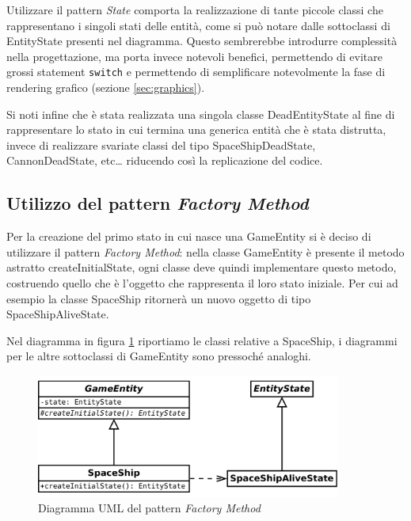 \documentclass[a4paper,12pt]{article}
\begin{document}
Utilizzare il pattern \emph{State} comporta la realizzazione di tante piccole classi che rappresentano i singoli stati delle entit\`a, come si pu\`o notare dalle sottoclassi di \textsf{EntityState} presenti nel diagramma. Questo sembrerebbe introdurre complessit\`a nella progettazione, ma porta invece notevoli benefici, permettendo di evitare grossi statement \texttt{switch} e permettendo di semplificare notevolmente la fase di rendering grafico (sezione \ref{sec:graphics}).

Si noti infine che \`e stata realizzata una singola classe \textsf{DeadEntityState} al fine di rappresentare lo stato in cui termina una generica entit\`a che \`e stata distrutta, invece di realizzare svariate classi del tipo \textsf{SpaceShipDeadState}, \textsf{CannonDeadState}, etc\dots{} riducendo cos\`i la replicazione del codice.

\subsection{Utilizzo del pattern \emph{Factory Method}}
\label{sec:factory}

Per la creazione del primo stato in cui nasce una \textsf{GameEntity} si \`e deciso di utilizzare il pattern \emph{Factory Method}: nella classe \textsf{GameEntity} \`e presente il metodo astratto \textsf{createInitialState}, ogni classe deve quindi implementare questo metodo, costruendo quello che \`e l'oggetto che rappresenta il loro stato iniziale. Per cui ad esempio la classe \textsf{SpaceShip} ritorner\`a un nuovo oggetto di tipo \textsf{SpaceShipAliveState}.

Nel diagramma in figura \ref{img:FactoryMethod} riportiamo le classi relative a \textsf{SpaceShip}, i diagrammi per le altre sottoclassi di \textsf{GameEntity} sono pressoch\'e analoghi.

\begin{figure}[h]
\centering
\includegraphics[width=10cm]{FactoryMethod.pdf}
\caption{Diagramma UML del pattern \emph{Factory Method}}
\label{img:FactoryMethod}
\end{figure}
\end{document}
